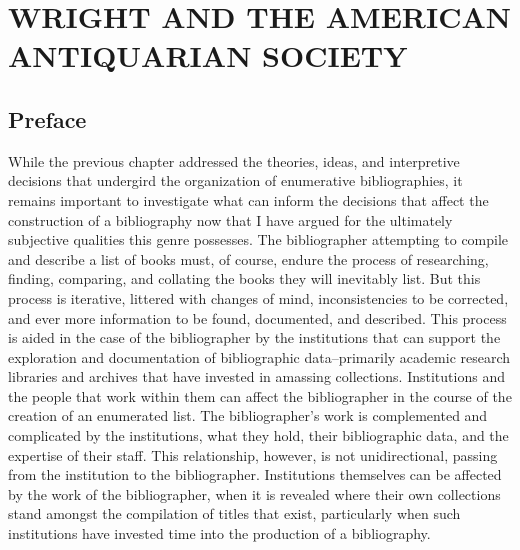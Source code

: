 %
%
%
%

\chapter{WRIGHT AND THE AMERICAN ANTIQUARIAN SOCIETY}

\section{Preface}

While the previous chapter addressed the theories, ideas, and interpretive decisions that undergird the organization of enumerative bibliographies, it remains important to investigate what can inform the decisions that affect the construction of a bibliography now that I have argued for the ultimately subjective qualities this genre possesses. The bibliographer attempting to compile and describe a list of books must, of course, endure the process of researching, finding, comparing, and collating the books they will inevitably list. But this process is iterative, littered with changes of mind, inconsistencies to be corrected, and ever more information to be found, documented, and described. This process is aided in the case of the bibliographer by the institutions that can support the exploration and documentation of bibliographic data--primarily academic research libraries and archives that have invested in amassing collections. Institutions and the people that work within them can affect the bibliographer in the course of the creation of an enumerated list. The bibliographer's work is complemented and complicated by the institutions, what they hold, their bibliographic data, and the expertise of their staff. This relationship, however, is not unidirectional, passing from the institution to the bibliographer. Institutions themselves can be affected by the work of the bibliographer, when it is revealed where their own collections stand amongst the compilation of titles that exist, particularly when such institutions have invested time into the production of a bibliography. 

